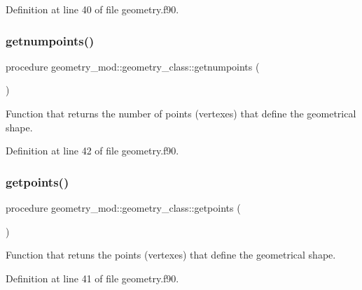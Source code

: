 Definition at line 40 of file geometry.\+f90.

\mbox{\label{structgeometry__mod_1_1geometry__class_a8988388d683fbf7e5727a39b71d3c479}} 
\subsubsection{\texorpdfstring{getnumpoints()}{getnumpoints()}}
{\footnotesize\ttfamily procedure geometry\+\_\+mod\+::geometry\+\_\+class\+::getnumpoints (\begin{DoxyParamCaption}{ }\end{DoxyParamCaption})\hspace{0.3cm}{\ttfamily [private]}}



Function that returns the number of points (vertexes) that define the geometrical shape. 



Definition at line 42 of file geometry.\+f90.

\mbox{\label{structgeometry__mod_1_1geometry__class_a4dd64d46f41c5c429a0b2b88250fa04e}} 
\subsubsection{\texorpdfstring{getpoints()}{getpoints()}}
{\footnotesize\ttfamily procedure geometry\+\_\+mod\+::geometry\+\_\+class\+::getpoints (\begin{DoxyParamCaption}{ }\end{DoxyParamCaption})\hspace{0.3cm}{\ttfamily [private]}}



Function that retuns the points (vertexes) that define the geometrical shape. 



Definition at line 41 of file geometry.\+f90.

